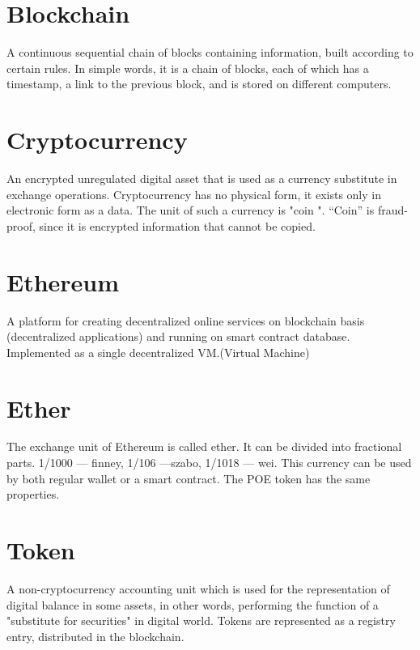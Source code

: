 \documentclass[a4paper,12pt]{report}
\begin{document}
\section{Blockchain}
A continuous sequential chain of blocks containing information,  built according to certain rules. In simple words, it is a chain of blocks, each of which has a timestamp, a link to the previous block, and is stored on different computers.

\section{Cryptocurrency}
An encrypted unregulated digital asset that is used as a currency substitute in exchange operations. Cryptocurrency has no physical form, it exists only in electronic form as a data.
The unit of such a currency is "coin ". “Coin”  is fraud-proof, since it is encrypted information that cannot be copied.


\section{Ethereum}
A platform for creating decentralized online services on blockchain basis (decentralized applications)  and running on smart contract database. Implemented as a single decentralized VM.(Virtual Machine)

\section{Ether}
The exchange unit of Ethereum is called ether. It can be divided into fractional parts. 1/1000 — finney, 1/106 —szabo, 1/1018 — wei. This currency can be used by both  regular wallet or a smart contract. The POE token has the same properties.

\section{Token}
A non-cryptocurrency accounting unit which is used  for the representation of digital balance in some assets, in other words, performing the function of a "substitute for securities" in digital world. Tokens are represented as a registry entry, distributed in the blockchain.
\end{document}
